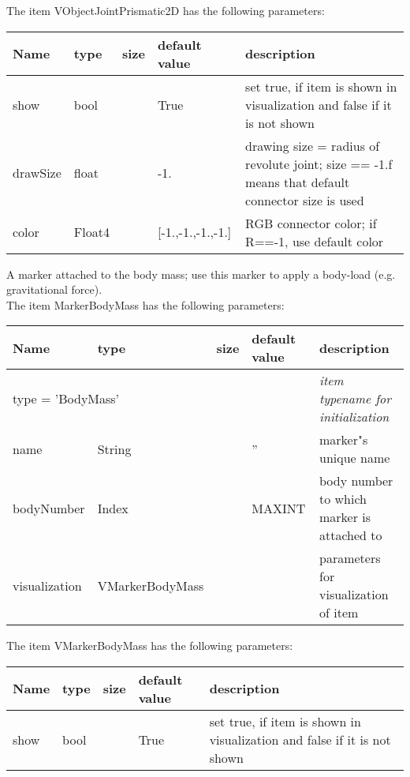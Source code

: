 The item VObjectJointPrismatic2D has the following parameters:
\begin{center}
  \footnotesize
  \begin{longtable}{| p{4.5cm} | p{2.5cm} | p{0.5cm} | p{2.5cm} | p{6cm} |}
    \hline
    \bf Name & \bf type & \bf size & \bf default value & \bf description \\ \hline
    show &     bool &      &     True &     set true, if item is shown in visualization and false if it is not shown\\ \hline
    drawSize &     float &      &     -1. &     drawing size = radius of revolute joint; size == -1.f means that default connector size is used\\ \hline
    color &     Float4 &      &     [-1.,-1.,-1.,-1.] &     RGB connector color; if R==-1, use default color\\ \hline
	  \end{longtable}
	\end{center}


A marker attached to the body mass; use this marker to apply a body-load (e.g. gravitational force).
 \\The item MarkerBodyMass has the following parameters:
\begin{center}
  \footnotesize
  \begin{longtable}{| p{4.5cm} | p{2.5cm} | p{0.5cm} | p{2.5cm} | p{6cm} |}
    \hline
    \bf Name & \bf type & \bf size & \bf default value & \bf description \\ \hline
    \multicolumn{4}{l}{\parbox{10cm}{type = 'BodyMass'}} & \multicolumn{1}{l}{\parbox{6cm}{\it item typename for initialization}}\\ \hline
    name &     String &      &     '' &     marker"s unique name\\ \hline
    bodyNumber &     Index &      &     MAXINT &     body number to which marker is attached to\\ \hline
    visualization & VMarkerBodyMass & & & parameters for visualization of item \\ \hline
	  \end{longtable}
	\end{center}
The item VMarkerBodyMass has the following parameters:
\begin{center}
  \footnotesize
  \begin{longtable}{| p{4.5cm} | p{2.5cm} | p{0.5cm} | p{2.5cm} | p{6cm} |}
    \hline
    \bf Name & \bf type & \bf size & \bf default value & \bf description \\ \hline
    show &     bool &      &     True &     set true, if item is shown in visualization and false if it is not shown\\ \hline
	  \end{longtable}
	\end{center}

